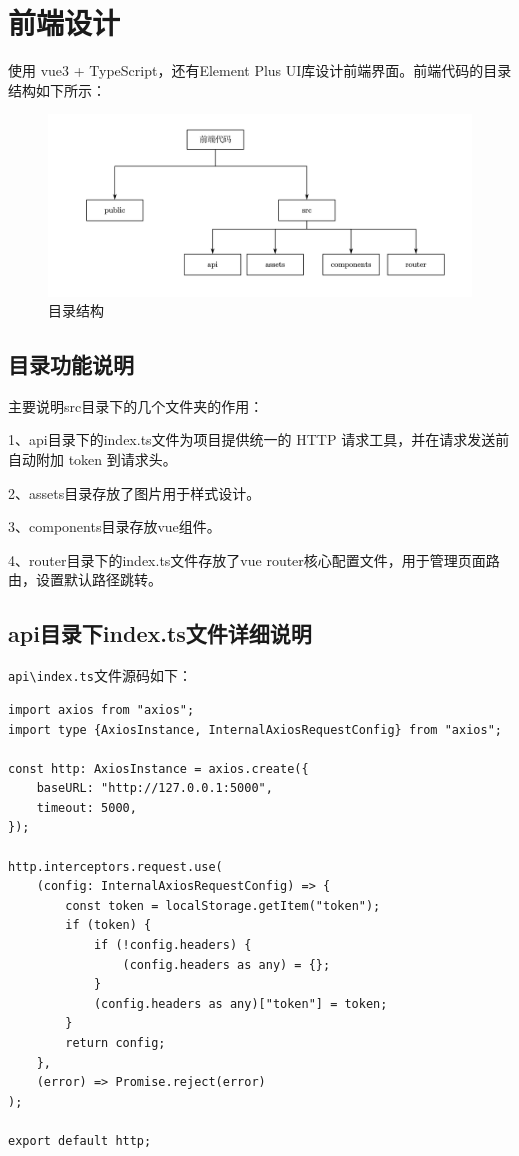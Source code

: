 \documentclass[a4paper,AutoFakeBold={2.7}]{ctexart} %
\begin{document}
\section{前端设计}

使用 vue3 + TypeScript，还有Element Plus UI库设计前端界面。前端代码的目录结构如下所示：

\begin{figure}[H]
	\centering
	\includegraphics[width=\linewidth]{./图片/目录结构.pdf}
	\caption{目录结构}\label{目录结构}
\end{figure}

\subsection{目录功能说明}
主要说明src目录下的几个文件夹的作用：

1、api目录下的index.ts文件为项目提供统一的 HTTP 请求工具，并在请求发送前自动附加 token 到请求头。

2、assets目录存放了图片用于样式设计。

3、components目录存放vue组件。

4、router目录下的index.ts文件存放了vue router核心配置文件，用于管理页面路由，设置默认路径跳转。

\subsection{api目录下index.ts文件详细说明}

\verb|api\index.ts|文件源码如下：

\begin{lstlisting}
import axios from "axios";
import type {AxiosInstance, InternalAxiosRequestConfig} from "axios";

const http: AxiosInstance = axios.create({
    baseURL: "http://127.0.0.1:5000",
    timeout: 5000,
});

http.interceptors.request.use(
    (config: InternalAxiosRequestConfig) => {
        const token = localStorage.getItem("token");
        if (token) {
            if (!config.headers) {
                (config.headers as any) = {};
            }
            (config.headers as any)["token"] = token;
        }
        return config;
    },
    (error) => Promise.reject(error)
);

export default http;
\end{lstlisting}
\end{document}
